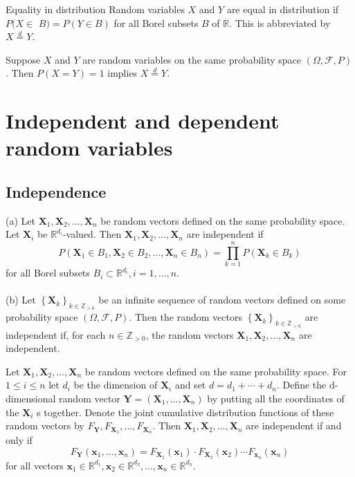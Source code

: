 \documentclass[11pt]{elegantbook}
\begin{document}
\begin{definition}{Equality in distribution}
Random variables $X$ and $Y$ are equal in distribution if $P(X \in$ $B)=P(Y \in B)$ for all Borel subsets $B$ of $\mathbb{R}$. This is abbreviated by $X \stackrel{d}{=} Y$. 
\end{definition}

\begin{theorem}
Suppose $X$ and $Y$ are random variables on the same probability space $(\Omega, \mathcal{F}, P)$. Then $P(X=Y)=1$ implies $X \stackrel{d}{=} Y$.
\end{theorem}

\chapter{Independent and dependent random variables}
\section{Independence}
\begin{definition}
(a) Let $\mathbf{X}_1, \mathbf{X}_2, \ldots, \mathbf{X}_n$ be random vectors defined on the same probability space. Let $\mathbf{X}_i$ be $\mathbb{R}^{d_i}$-valued. Then $\mathbf{X}_1, \mathbf{X}_2, \ldots, \mathbf{X}_n$ are independent if
$$
P\left(\mathbf{X}_1 \in B_1, \mathbf{X}_2 \in B_2, \ldots, \mathbf{X}_n \in B_n\right)=\prod_{k=1}^n P\left(\mathbf{X}_k \in B_k\right)
$$
for all Borel subsets $B_i \subset \mathbb{R}^{d_i}, i=1, \ldots, n$.\\\\
(b) Let $\left\{\mathbf{X}_k\right\}_{k \in \mathbb{Z}_{>0}}$ be an infinite sequence of random vectors defined on some probability space $(\Omega, \mathcal{F}, P)$. Then the random vectors $\left\{\mathbf{X}_k\right\}_{k \in \mathbb{Z}_{>0}}$ are independent if, for each $n \in \mathbb{Z}_{>0}$, the random vectors $\mathbf{X}_1, \mathbf{X}_2, \ldots, \mathbf{X}_n$ are independent.

\end{definition}

\begin{theorem}
 Let $\mathbf{X}_1, \mathbf{X}_2, \ldots, \mathbf{X}_n$ be random vectors defined on the same probability space. For $1 \leq i \leq n$ let $d_i$ be the dimension of $\mathbf{X}_i$ and set $d=d_1+\cdots+d_n$. Define the d-dimensional random vector $\mathbf{Y}=\left(\mathbf{X}_1, \ldots, \mathbf{X}_n\right)$ by putting all the coordinates of the $\mathbf{X}_i$ s together. Denote the joint cumulative distribution functions of these random vectors by $F_{\mathbf{Y}}, F_{\mathbf{X}_1}, \ldots, F_{\mathbf{X}_n}$. Then $\mathbf{X}_1, \mathbf{X}_2, \ldots, \mathbf{X}_n$ are independent if and only if
$$
F_{\mathbf{Y}}\left(\mathbf{x}_1, \ldots, \mathbf{x}_n\right)=F_{\mathbf{X}_1}\left(\mathbf{x}_1\right) \cdot F_{\mathbf{X}_2}\left(\mathbf{x}_2\right) \cdots F_{\mathbf{x}_n}\left(\mathbf{x}_n\right)
$$
for all vectors $\mathbf{x}_1 \in \mathbb{R}^{d_1}, \mathbf{x}_2 \in \mathbb{R}^{d_2}, \ldots, \mathbf{x}_n \in \mathbb{R}^{d_n}$.
\end{theorem}
\end{document}

